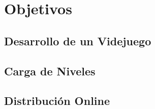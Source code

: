\chapter{Objetivos}
\label{chap:objetivos}
\section{Desarrollo de un Videjuego}
\section{Carga de Niveles}
\section{Distribución Online}